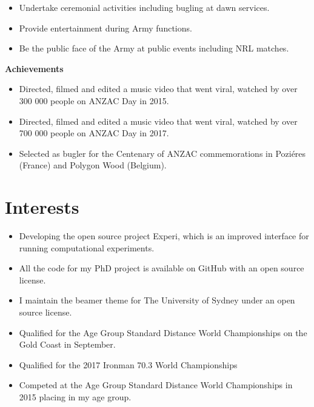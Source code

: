 {}{}
{%
  \begin{itemize}
    \item Undertake ceremonial activities including bugling at dawn services.
    \item Provide entertainment during Army functions.
    \item Be the public face of the Army at public events including NRL matches.
  \end{itemize}
  \textbf{Achievements}
  \begin{itemize}
    \item Directed, filmed and edited a music video  that went viral, watched by over 300 000 people on ANZAC Day in 2015.
    \item Directed, filmed and edited a music video  that went viral, watched by over 700 000 people on ANZAC Day in 2017.
    \item Selected as bugler for the Centenary of ANZAC commemorations in Poziéres (France) and Polygon Wood (Belgium).
  \end{itemize}
}

\section{Interests}

{%
  \begin{itemize}
    \item Developing the open source project Experi, which is an improved interface for running computational
      experiments.
    \item All the code for my PhD project is available on GitHub with an open source license.
    \item I maintain the beamer theme for The University of Sydney under an open source license.
  \end{itemize}
}

{%
  \begin{itemize}
    \item Qualified for the Age Group Standard Distance World Championships on the Gold Coast in
      September.
    \item Qualified for the 2017 Ironman 70.3 World Championships
    \item Competed at the Age Group Standard Distance World Championships in 2015 placing  in my age group.
  \end{itemize}
}




